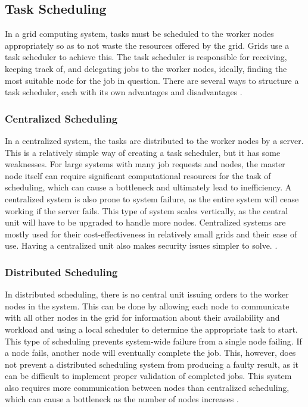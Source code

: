 \subsection{Task Scheduling}
In a grid computing system, tasks must be scheduled to the worker nodes appropriately so as to not waste the resources offered by the grid. Grids use a task scheduler to achieve this. The task scheduler is responsible for receiving, keeping track of, and delegating jobs to the worker nodes, ideally, finding the most suitable node for the job in question. There are several ways to structure a task scheduler, each with its own advantages and disadvantages \cite{TaskSchedulingReview}.

\subsubsection{Centralized Scheduling}
In a centralized system, the tasks are distributed to the worker nodes by a server. This is a relatively simple way of creating a task scheduler, but it has some weaknesses. For large systems with many job requests and nodes, the master node itself can require significant computational resources for the task of scheduling, which can cause a bottleneck and ultimately lead to inefficiency. A centralized system is also prone to system failure, as the entire system will cease working if the server fails. This type of system scales vertically, as the central unit will have to be upgraded to handle more nodes. Centralized systems are mostly used for their cost-effectiveness in relatively small grids and their ease of use. Having a centralized unit also makes security issues simpler to solve. \cite{TaskSchedulingReview, SchedulingInGridComputing}.

\subsubsection{Distributed Scheduling}
In distributed scheduling, there is no central unit issuing orders to the worker nodes in the system. This can be done by allowing each node to communicate with all other nodes in the grid for information about their availability and workload and using a local scheduler to determine the appropriate task to start. This type of scheduling prevents system-wide failure from a single node failing. If a node fails, another node will eventually complete the job. This, however, does not prevent a distributed scheduling system from producing a faulty result, as it can be difficult to implement proper validation of completed jobs. This system also requires more communication between nodes than centralized scheduling, which can cause a bottleneck as the number of nodes increases \cite{SchedulingInGridComputing, Systems_geeks}.

